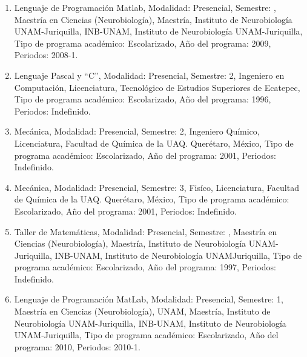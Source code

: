 \begin{enumerate}
\item Lenguaje de Programación Matlab, Modalidad: Presencial, Semestre: , Maestría en Ciencias (Neurobiología), Maestría, 
Instituto de Neurobiología UNAM-Juriquilla, INB-UNAM, Instituto de Neurobiología UNAM-Juriquilla, Tipo de programa académico: 
Escolarizado, Año del programa: 2009, Periodos: 2008-1.

\item Lenguaje Pascal y “C”, Modalidad: Presencial, Semestre: 2, Ingeniero en Computación, Licenciatura, Tecnológico de 
Estudios Superiores de Ecatepec, Tipo de programa académico: Escolarizado, Año del programa: 1996, Periodos: Indefinido.

\item Mecánica, Modalidad: Presencial, Semestre: 2, Ingeniero Químico, Licenciatura, Facultad de Química de la UAQ. 
Querétaro, 
México, Tipo de programa académico: Escolarizado, Año del programa: 2001, Periodos: Indefinido.

\item Mecánica, Modalidad: Presencial, Semestre: 3, Fisíco, Licenciatura, Facultad de Química de la UAQ. Querétaro, México, 
Tipo de programa académico: Escolarizado, Año del programa: 2001, Periodos: Indefinido.

\item Taller de Matemáticas, Modalidad: Presencial, Semestre: , Maestría en Ciencias (Neurobiología), Maestría, Instituto de 
Neurobiología UNAM-Juriquilla, INB-UNAM, Instituto de Neurobiología UNAMJuriquilla, Tipo de programa académico: Escolarizado, 
Año del programa: 1997, Periodos: Indefinido.

\item Lenguaje de Programación MatLab, Modalidad: Presencial, Semestre: 1, Maestría en Ciencias (Neurobiología), UNAM, 
Maestría, Instituto de Neurobiología UNAM-Juriquilla, INB-UNAM, Instituto de Neurobiología UNAM-Juriquilla, Tipo de programa 
académico: Escolarizado, Año del programa: 2010, Periodos: 2010-1.

\end{enumerate}


